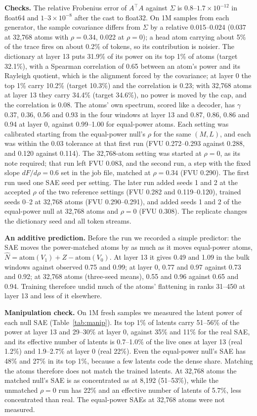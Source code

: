 \documentclass[10pt,twocolumn]{article}
\newcommand{\Sig}{\Sigma}
\begin{document}
\textbf{Checks.} The relative Frobenius error of $A^\top A$ against $\Sig$ is $0.8$--$1.7\times10^{-12}$ in float64 and $1$--$3\times10^{-8}$ after the cast to float32. On 1M samples from each generator, the sample covariance differs from $\Sig$ by a relative 0.015--0.024 (0.037 at 32,768 atoms with $\rho=0.34$, 0.022 at $\rho=0$); a head atom carrying about 5\% of the trace fires on about 0.2\% of tokens, so its contribution is noisier. The dictionary at layer 13 puts 31.9\% of its power on its top 1\% of atoms (target 32.1\%), with a Spearman correlation of 0.65 between an atom's power and its Rayleigh quotient, which is the alignment forced by the covariance; at layer 0 the top 1\% carry 10.2\% (target 10.3\%) and the correlation is 0.23; with 32,768 atoms at layer 13 they carry 34.4\% (target 34.6\%), no power is moved by the cap, and the correlation is 0.08. The atoms' own spectrum, scored like a decoder, has $\gamma$ 0.37, 0.36, 0.56 and 0.93 in the four windows at layer 13 and 0.87, 0.86, 0.86 and 0.94 at layer 0, against 0.99--1.00 for equal-power atoms. Each setting was calibrated starting from the equal-power null's $\rho$ for the same $(M,L)$, and each was within the 0.03 tolerance at that first run (FVU 0.272--0.293 against 0.288, and 0.120 against 0.114). The 32,768-atom setting was started at $\rho=0$, as its note required; that run left FVU 0.083, and the second run, a step with the fixed slope $dF/d\rho=0.6$ set in the job file, matched at $\rho=0.34$ (FVU 0.290). The first run used one SAE seed per setting. The later run added seeds 1 and 2 at the accepted $\rho$ of the two reference settings (FVU 0.282 and 0.119--0.120), trained seeds 0--2 at 32,768 atoms (FVU 0.290--0.291), and added seeds 1 and 2 of the equal-power null at 32,768 atoms and $\rho=0$ (FVU 0.308). The replicate changes the dictionary seed and all token streams.

\textbf{An additive prediction.} Before the run we recorded a simple predictor: the SAE moves the power-matched atoms by as much as it moves equal-power atoms, $\hat N = \mathrm{atom}(V_1) + Z - \mathrm{atom}(V_0)$. At layer 13 it gives 0.49 and 1.09 in the bulk windows against observed 0.75 and 0.99; at layer 0, 0.77 and 0.97 against 0.73 and 0.92; at 32,768 atoms (three-seed means), 0.55 and 0.96 against 0.65 and 0.94. Training therefore undid much of the atoms' flattening in ranks 31--450 at layer 13 and less of it elsewhere.

\textbf{Manipulation check.} On 1M fresh samples we measured the latent power of each null SAE (Table~\ref{tab:manip}). Its top 1\% of latents carry 51--56\% of the power at layer 13 and 29--30\% at layer 0, against 35\% and 11\% for the real SAE, and its effective number of latents is 0.7--1.0\% of the live ones at layer 13 (real 1.2\%) and 1.9--2.7\% at layer 0 (real 22\%). Even the equal-power null's SAE has 48\% and 27\% in its top 1\%, because a few latents code the dense share. Matching the atoms therefore does not match the trained latents. At 32,768 atoms the matched null's SAE is as concentrated as at 8,192 (51--53\%), while the unmatched $\rho=0$ run has 22\% and an effective number of latents of 5.7\%, less concentrated than real. The equal-power SAEs at 32,768 atoms were not measured.
\end{document}
